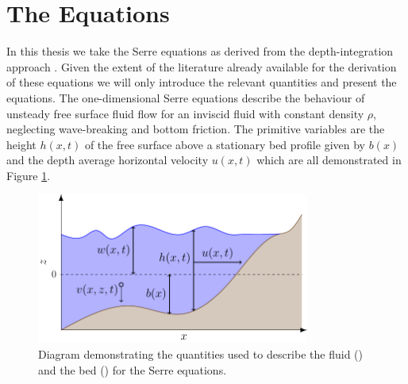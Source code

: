 \section{The Equations}
In this thesis we take the Serre equations as derived from the depth-integration approach \cite{Su-Gardener-1969-536,Seabra-Santos-etal-1987-117}. Given the extent of the literature already available for the derivation of these equations we will only introduce the relevant quantities and present the equations. The one-dimensional Serre equations describe the behaviour of unsteady free surface fluid flow for an inviscid fluid with constant density $\rho$, neglecting wave-breaking and bottom friction. The primitive variables are the height $h(x,t)$ of the free surface above a stationary bed profile given by $b(x)$ and the depth average horizontal velocity $u(x,t)$ which are all demonstrated in Figure \ref{fig:WaterModel}. 

\begin{figure}
	\centering
	\includegraphics[width=0.8\textwidth]{./chp2/figures/SerreModel.pdf}
	\caption{Diagram demonstrating the quantities used to describe the fluid () and the bed () for the Serre equations.}
	\label{fig:WaterModel}
\end{figure}

